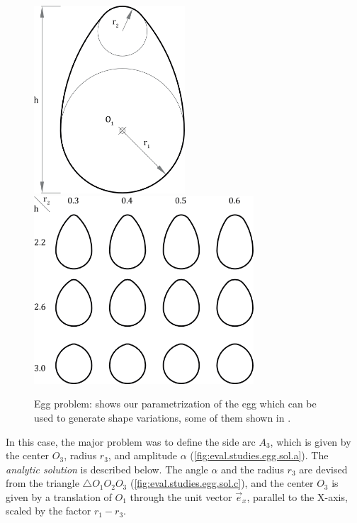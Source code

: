 \begin{figure}[htb]
    {\includegraphics[height=7cm]{fig/egg-problem-params}}
  \hfill
    {\includegraphics[height=7cm]{fig/egg-problem-vars}}
  \caption[Egg problem]{Egg problem:
   shows our parametrization of the
  egg which can be used to generate shape variations, some of them shown in
  .}\label{fig:eval.studies.egg.prob}
\end{figure}

In this case, the major problem was to define the side arc $A_3$, which is given
by the center $O_3$, radius $r_3$, and amplitude $\alpha$
(\cref{fig:eval.studies.egg.sol.a}). The \textit{analytic solution} is described
below. The angle $\alpha$ and the radius $r_3$ are devised from the triangle
$\triangle O_1 O_2 O_3$ (\cref{fig:eval.studies.egg.sol.c}), and the center
$O_3$ is given by a translation of $O_1$ through the unit vector $\vec{e}_x$,
parallel to the X-axis, scaled by the factor $r_1 - r_3$.

